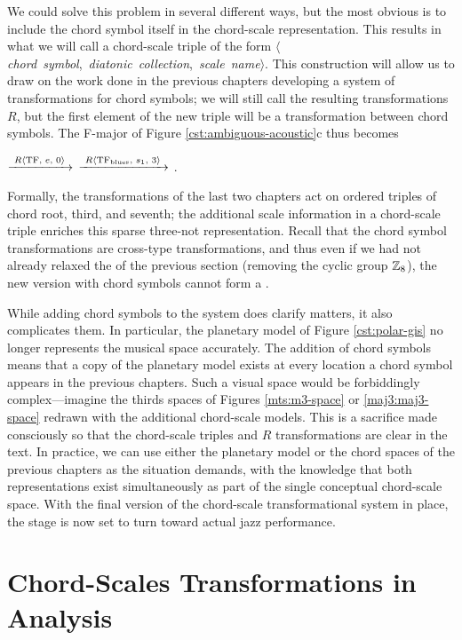 We could solve this problem in several different ways, but the most obvious is
to include the chord symbol itself in the chord-scale representation. This
results in what we will call a chord-scale triple of the form
\mbox{$\langle$\emph{chord symbol}, \emph{diatonic collection}, \emph{scale
    name}$\rangle$}. This construction will allow us to draw on the work done
in the previous chapters developing a system of transformations for chord
symbols; we will still call the resulting transformations $R$, but the first
element of the new triple will be a transformation between chord
symbols. The F-major \tfo of Figure \ref{cst:ambiguous-acoustic}c
thus becomes \\
{ \centering {}
  $\xrightarrow{\text{ \mbox{\ensuremath{R\langle}TF, $e$, $0$\ensuremath{\rangle}} }}$ 
  $\xrightarrow{\text{ \mbox{\ensuremath{R\langle}TF\textsubscript{blues}, $s_1$, $3$\ensuremath{\rangle}} }}$
  .
  \par
}
\noindent Formally, the transformations of the last two chapters act on
ordered triples of chord root, third, and seventh; the additional scale
information in a chord-scale triple enriches this sparse three-not
representation. Recall that the chord symbol transformations are
cross-type transformations, and thus even if we had not already relaxed the
\gis of the previous section (removing the cyclic group $\mathbb{Z}_8$), the new
version with chord symbols cannot form a \gis.

While adding chord symbols to the system does clarify matters, it also
complicates them. In particular, the planetary model of Figure
\ref{cst:polar-gis} no longer represents the musical space accurately. The
addition of chord symbols means that a copy of the planetary model exists at
every location a chord symbol appears in the previous chapters.
Such a visual space would be forbiddingly complex---imagine the thirds spaces
of Figures \ref{mts:m3-space} or \ref{maj3:maj3-space} redrawn with the
additional chord-scale models. This is a sacrifice made consciously so that
the chord-scale triples and $R$ transformations are clear in the text. In
practice, we can use either the planetary model or the chord spaces of the
previous chapters as the situation demands, with the knowledge that both
representations exist simultaneously as part of the single conceptual
chord-scale space. With the final version of the chord-scale transformational
system in place, the stage is now set to turn toward actual jazz
performance.

\section{Chord-Scales Transformations in Analysis}
\label{sec:chord-scale-analysis}

